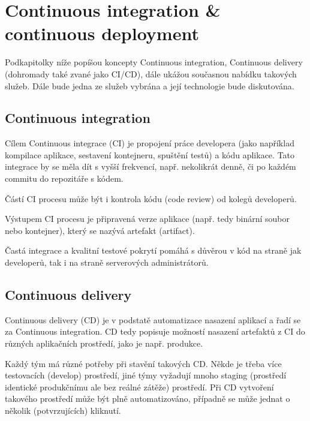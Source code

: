 \documentclass[thesis=M,czech]{FITthesis}[2019/12/23]
\theoremstyle{plain}
\theoremstyle{definition}
\begin{document}


\section{Continuous integration \& continuous deployment}

Podkapitolky níže popíšou koncepty Continuous integration, Continuous delivery (dohromady také zvané jako CI/CD), dále ukážou současnou nabídku takových služeb. Dále bude jedna ze služeb vybrána a její technologie bude diskutována.

\subsection{Continuous integration}

Cílem Continuous integrace (CI) \cite{fowler-ci}je propojení práce developera (jako například kompilace aplikace, sestavení kontejneru, spuštění testů) a kódu aplikace. Tato integrace by se měla dít s vyšší frekvencí, např. nekolikrát denně, či po každém commitu do repozitáře s kódem.

Částí CI procesu může být i kontrola kódu (code review) od kolegů developerů.

Výstupem CI procesu je připravená verze aplikace (např. tedy binární soubor nebo kontejner), který se nazývá artefakt (artifact).


Častá integrace a kvalitní testové pokrytí pomáhá s důvěrou v kód na straně jak developerů, tak i na straně serverových administrátorů. 

\subsection{Continuous delivery}

Continuous delivery (CD) je v podstatě automatizace nasazení aplikací a řadí se za Continuous integration. CD tedy popisuje možností nasazení artefaktů z CI do různých aplikačních prostředí, jako je např. produkce.\cite{humble-ci}

Každý tým má různé potřeby při stavění takových CD. Někde je třeba více testovacích (develop) prostředí, jiné týmy vyžadují mnoho staging (prostředí identické produkčnímu ale bez reálné zátěže) prostředí. Při CD vytvoření takového prostředí může být plně automatizováno, případně se může jednat o několik (potvrzujících) kliknutí.

\end{document}

